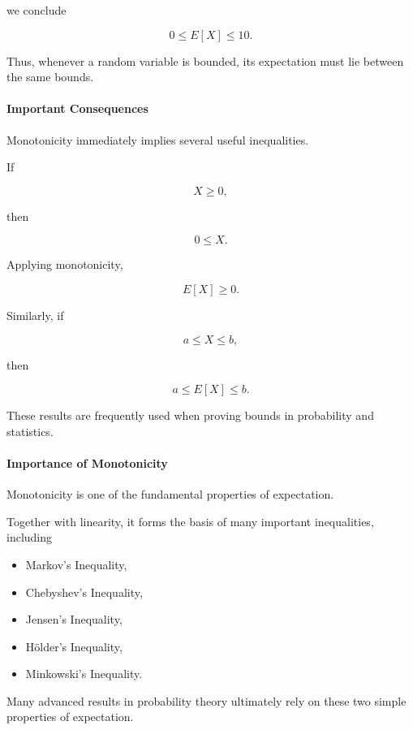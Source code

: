 \documentclass[11pt]{article}
\begin{document}
\begin{mdframed}[
		linewidth=0.8pt,
		roundcorner=6pt,
		backgroundcolor=gray!5,
		linecolor=gray!60,
		innertopmargin=10pt,
		innerbottommargin=10pt,
		innerleftmargin=10pt,
		innerrightmargin=10pt
		]
		we conclude
		
		\[
		\boxed{
			0
			\le
			E[X]
			\le
			10.
		}
		\]
		
		Thus, whenever a random variable is bounded, its expectation must lie
		between the same bounds.
		
		\bigskip
		
		\paragraph{Important Consequences}
		
		Monotonicity immediately implies several useful inequalities.
		
		If
		
		\[
		X\ge0,
		\]
		
		then
		
		\[
		0\le X.
		\]
		
		Applying monotonicity,
		
		\[
		\boxed{
			E[X]\ge0.
		}
		\]
		
		Similarly, if
		
		\[
		a\le X\le b,
		\]
		
		then
		
		\[
		\boxed{
			a
			\le
			E[X]
			\le
			b.
		}
		\]
		
		These results are frequently used when proving bounds in probability and
		statistics.
		
		\bigskip
		
		\paragraph{Importance of Monotonicity}
		
		Monotonicity is one of the fundamental properties of expectation.
		
		Together with linearity, it forms the basis of many important inequalities,
		including
		
		\begin{itemize}
			\item Markov's Inequality,
			\item Chebyshev's Inequality,
			\item Jensen's Inequality,
			\item Hölder's Inequality,
			\item Minkowski's Inequality.
		\end{itemize}
		
		Many advanced results in probability theory ultimately rely on these two
		simple properties of expectation.
		
	\end{mdframed}
	
\end{document}
